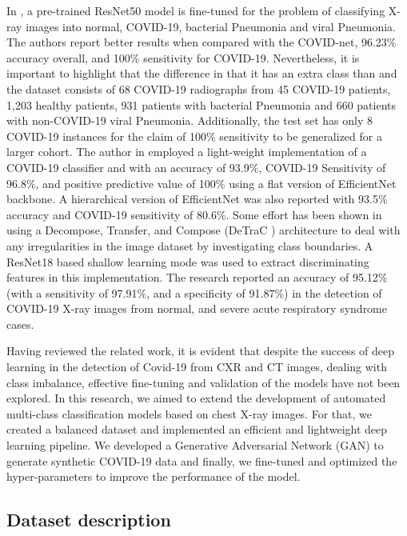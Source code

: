 In \cite{farooq2020covid}, a pre-trained ResNet50 model is fine-tuned for the problem of classifying X-ray images into normal, COVID-19, bacterial Pneumonia and viral Pneumonia. The authors report better results when compared with the COVID-net, 96.23\% accuracy overall, and 100\% sensitivity for COVID-19. Nevertheless, it is important to highlight that the difference in \cite{farooq2020covid} that it has an extra class than \cite{wang2020covid} and the dataset consists of 68 COVID-19 radiographs from 45 COVID-19 patients, 1,203 healthy patients, 931 patients with bacterial Pneumonia and 660 patients with non-COVID-19 viral Pneumonia. Additionally, the test set has only 8 COVID-19 instances for the claim of 100\% sensitivity to be generalized for a larger cohort. The author in \cite{luz2020efficient} employed a light-weight implementation of a COVID-19 classifier and with an accuracy of 93.9\%, COVID-19 Sensitivity of 96.8\%, and positive
predictive value of 100\%  using a flat version of EfficientNet backbone. A hierarchical version of EfficientNet was also reported with 93.5\% accuracy and COVID-19 sensitivity of 80.6\%.  Some effort has been shown in \cite{abbas2020classification} using a Decompose, Transfer, and Compose (DeTraC ) architecture to deal with any irregularities in the
image dataset by investigating class boundaries. A ResNet18 based shallow learning mode was used to extract discriminating features in this implementation. The research reported an accuracy of 95.12\% (with a sensitivity of 97.91\%, and a specificity of 91.87\%) in the detection of COVID-19 X-ray images from normal, and severe acute respiratory syndrome cases.

Having reviewed the related work, it is evident that despite the success of
deep learning in the detection of Covid-19 from CXR and CT images, dealing with class
imbalance,  effective fine-tuning and validation of the models  have not been explored. In this research, we aimed to extend the development of automated multi-class classification models based on chest X-ray images. For that, we created a balanced dataset and  implemented an efficient and lightweight deep learning pipeline.
We developed a Generative Adversarial Network (GAN) to generate synthetic COVID-19 data and finally, we fine-tuned and optimized the hyper-parameters to improve the performance of the model. 



\subsection{Dataset description}

